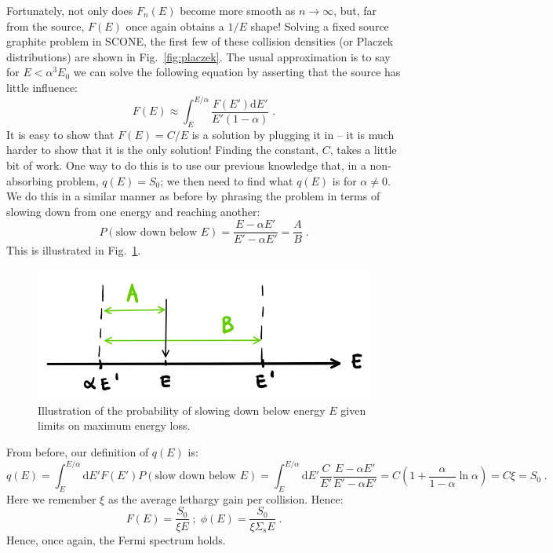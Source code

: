 Fortunately, not only does $F_n(E)$ become more smooth as $n\rightarrow \infty$, but, far from the source, $F(E)$ once again obtains a $1/E$ shape! Solving a fixed source graphite problem in SCONE, the first few of these collision densities (or Placzek distributions) are shown in Fig.~\ref{fig:placzek}. The usual approximation is to say for $E < \alpha^3 E_0$ we can solve the following equation by asserting that the source has little influence:
\begin{equation*}
    F(E) \approx \int^{E/\alpha}_{E}\frac{F(E')\mathrm{d}E'}{E'(1-\alpha)}\;\mathrm{.}
\end{equation*}
It is easy to show that $F(E) = C/E$ is a solution by plugging it in -- it is much harder to show that it is the only solution! Finding the constant, $C$, takes a little bit of work. One way to do this is to use our previous knowledge that, in a non-absorbing problem, $q(E) = S_0$; we then need to find what $q(E)$ is for $\alpha \neq 0$. We do this in a similar manner as before by phrasing the problem in terms of slowing down from one energy and reaching another:
\begin{equation*}
    P\left(\text{slow down below }E\right) = \frac{E - \alpha E'}{E' - \alpha E'} = \frac{A}{B}\;\mathrm{.}
\end{equation*}
This is illustrated in Fig.~\ref{fig:prob_collide_alpha}.

\begin{figure}[h]
  \centering
  \includegraphics[scale=0.70]{./Figures/P2/probCollideAlpha.png} 
  \caption{Illustration of the probability of slowing down below energy $E$ given limits on maximum energy loss.} 
  \label{fig:prob_collide_alpha}
\end{figure}

From before, our definition of $q(E)$ is:
\begin{equation*}
    q(E) = \int^{E/\alpha}_E \mathrm{d} E' F(E')P(\text{slow down below }E) = \int^{E/\alpha}_E \mathrm{d}E' \frac{C}{E'} \frac{E - \alpha E'}{E' - \alpha E'} = C\left(1 + \frac{\alpha}{1-\alpha}\ln\alpha\right) = C\xi = S_0\;\mathrm{.}
\end{equation*}
Here we remember $\xi$ as the average lethargy gain per collision. Hence:
\begin{equation*}
    F(E) = \frac{S_0}{\xi E}\;\mathrm{;}\; \phi(E) = \frac{S_0}{\xi \Sigma_\mathrm{s} E}\;\mathrm{.}
\end{equation*}
Hence, once again, the Fermi spectrum holds.

